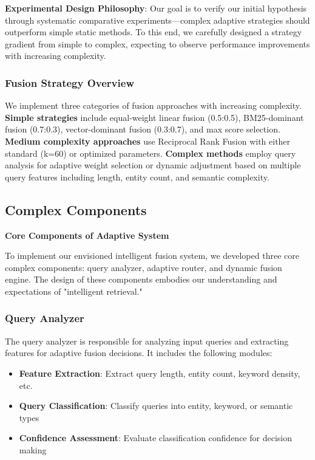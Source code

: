 \documentclass[letterpaper]{article} %
\begin{document}
\textbf{Experimental Design Philosophy}: Our goal is to verify our initial hypothesis through systematic comparative experiments—complex adaptive strategies should outperform simple static methods. To this end, we carefully designed a strategy gradient from simple to complex, expecting to observe performance improvements with increasing complexity.

\subsubsection{Fusion Strategy Overview}

We implement three categories of fusion approaches with increasing complexity. \textbf{Simple strategies} include equal-weight linear fusion (0.5:0.5), BM25-dominant fusion (0.7:0.3), vector-dominant fusion (0.3:0.7), and max score selection. \textbf{Medium complexity approaches} use Reciprocal Rank Fusion with either standard (k=60) or optimized parameters. \textbf{Complex methods} employ query analysis for adaptive weight selection or dynamic adjustment based on multiple query features including length, entity count, and semantic complexity.

\subsection{Complex Components}

\textbf{Core Components of Adaptive System}

To implement our envisioned intelligent fusion system, we developed three core complex components: query analyzer, adaptive router, and dynamic fusion engine. The design of these components embodies our understanding and expectations of "intelligent retrieval."

\subsubsection{Query Analyzer}

The query analyzer is responsible for analyzing input queries and extracting features for adaptive fusion decisions. It includes the following modules:

\begin{itemize}
\item \textbf{Feature Extraction}: Extract query length, entity count, keyword density, etc.\\
\item \textbf{Query Classification}: Classify queries into entity, keyword, or semantic types\\
\item \textbf{Confidence Assessment}: Evaluate classification confidence for decision making
\end{itemize}
\end{document}
